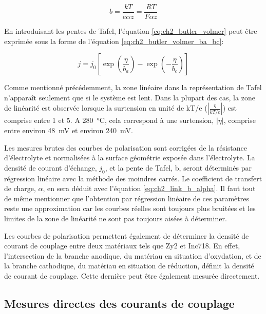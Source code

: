 \begin{refsection}
    \begin{equation}
         b = \frac{kT}{e \alpha z} = \frac{RT}{F \alpha z}   
         \label{eq:ch2_link_b_alpha}
    \end{equation}

    \noindent En introduisant les pentes de Tafel, l'équation \ref{eq:ch2_butler_volmer}
    peut être exprimée sous la forme de l'équation \ref{eq:ch2_butler_volmer_ba_bc}:
    
    \begin{equation}
         j = j_0 \left[ \exp\left( \frac{\eta}{b_a}\right) - \exp\left( -\frac{\eta}{b_c}\right)  \right] 
    \label{eq:ch2_butler_volmer_ba_bc}
    \end{equation}

    Comme mentionné précédemment, la zone linéaire dans la représentation de Tafel n'apparaît seulement que si le système est lent.
    Dans la plupart des cas, la zone de linéarité est observée lorsque la surtension en unité de kT/e ($\left|
    \frac{\eta}{kT/e} \right|$) est comprise entre 1 et 5.
    A \SI{280}{\degreeCelsius}, cela correspond à une surtension, $\vert \eta \vert$, comprise entre environ \SI{
    48}{\milli\volt} et environ \SI{240}{\milli\volt}. 

    Les mesures brutes des courbes de polarisation sont corrigées de la résistance d'électrolyte et normalisées à la
    surface géométrie exposée dans l'électrolyte.
    La densité de courant d'échange, $j_0$, et la pente de Tafel, b, seront déterminés par régression linéaire avec la
    méthode des moindres carrés.
    Le coefficient de transfert de charge, $\alpha$, en sera déduit avec l'équation \ref{eq:ch2_link_b_alpha}. Il faut tout
    de même mentionner que l'obtention par régression linéaire de ces paramètres reste une approximation car les courbes réelles
    sont toujours plus bruitées et les limites de la zone de linéarité ne sont pas toujours aisées à déterminer.  

    Les courbes de polarisation permettent également de déterminer la densité de courant de couplage entre deux
    matériaux
    tels que Zy2 et Inc718.
    En effet, l'intersection de la branche anodique, du matériau en situation d'oxydation, et de la branche cathodique, du
    matériau en situation de réduction, définit la densité de courant de couplage. Cette dernière peut être également
    mesurée directement. 
    
    
    \subsection{Mesures directes des courants de couplage}\label{subsec:ch2_ZRA}


\end{refsection}
